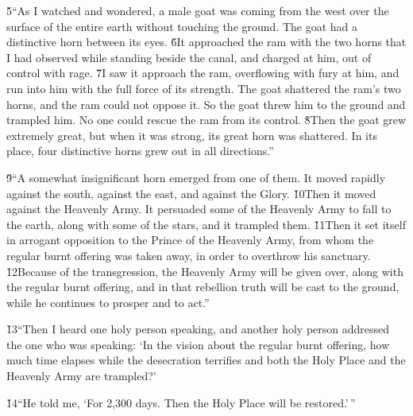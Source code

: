 \v{5}``As I watched and wondered, a male goat was coming from the west over the surface of the entire earth without touching the ground. The goat had a distinctive horn between its eyes. \v{6}It approached the ram with the two horns that I had observed while standing beside the canal, and charged at him, out of control with rage. \v{7}I saw it approach the ram, overflowing with fury at him, and run into him with the full force of its strength. The goat shattered the ram's two horns, and the ram could not oppose it. So the goat threw him to the ground and trampled him. No one could rescue the ram from its control. \v{8}Then the goat grew extremely great, but when it was strong, its great horn was shattered. In its place, four distinctive horns grew out in all directions.''

\v{9}``A somewhat insignificant horn emerged from one of them. It moved rapidly against the south, against the east, and against the Glory. \v{10}Then it moved against the Heavenly Army. It persuaded some of the Heavenly Army to fall to the earth, along with some of the stars, and it trampled them. \v{11}Then it set itself in arrogant opposition to the Prince of the Heavenly Army, from whom the regular burnt offering was taken away, in order to overthrow his sanctuary. \v{12}Because of the transgression, the Heavenly Army will be given over, along with the regular burnt offering, and in that rebellion truth will be cast to the ground, while he continues to prosper and to act.''

\v{13}``Then I heard one holy person speaking, and another holy person addressed the one who was speaking: `In the vision about the regular burnt offering, how much time elapses while the desecration terrifies and both the Holy Place and the Heavenly Army are trampled?'

\v{14}``He told me, `For 2,300 days. Then the Holy Place will be restored.'\,''

